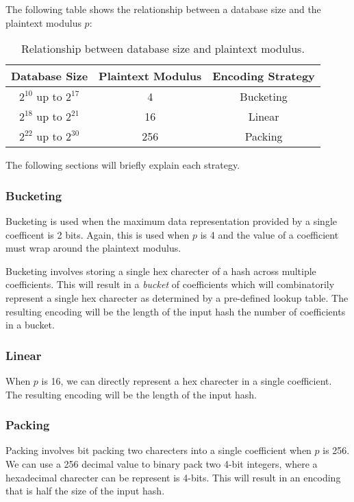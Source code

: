 The following table shows the relationship between a database size and the plaintext modulus $p$:

\begin{table}[h]
    \centering
    \begin{tabular}{|c|c|c|}
        \hline
        Database Size & Plaintext Modulus & Encoding Strategy \\
        \hline
        $2^{10}$ up to $2^{17}$ & 4   & Bucketing \\
        $2^{18}$ up to $2^{21}$ & 16  & Linear \\
        $2^{22}$ up to $2^{30}$ & 256 & Packing \\
        \hline
    \end{tabular}
    \caption{Relationship between database size and plaintext modulus.}
    \label{tab:encoding_strategies}
\end{table}

The following sections will briefly explain each strategy.

\subsubsection{Bucketing}

Bucketing is used when the maximum data representation provided by a single coefficent is
2 bits. Again, this is used when $p$ is 4 and the value of a coefficient must wrap around the
plaintext modulus.

Bucketing involves storing a single hex charecter of a hash across multiple coefficients.
This will result in a \textit{bucket} of coefficients which will combinatorily represent a single
hex charecter as determined by a pre-defined lookup table. The resulting encoding will be the length
of the input hash \times the number of coefficients in a bucket.

\subsubsection{Linear}

When $p$ is 16, we can directly represent a hex charecter in a single
coefficient. The resulting encoding will be the length of the input hash.

\subsubsection{Packing}

Packing involves bit packing two charecters into a single coefficient when $p$ is 256. We
can use a 256 decimal value to binary pack two 4-bit integers, where a hexadecimal
charecter can be represent is 4-bits. This will result in an encoding that is half the
size of the input hash.
